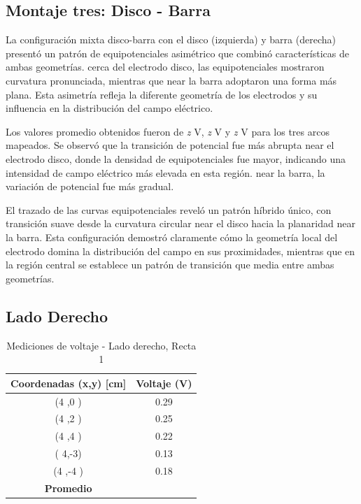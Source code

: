 \documentclass[11pt,twocolumn]{article}
\begin{document}
\subsection*{Montaje tres: Disco - Barra}

La configuración mixta disco-barra con el disco (izquierda) y barra (derecha) presentó un patrón de equipotenciales asimétrico que combinó características de ambas geometrías. cerca del electrodo disco, las equipotenciales mostraron curvatura pronunciada, mientras que near la barra adoptaron una forma más plana. Esta asimetría refleja la diferente geometría de los electrodos y su influencia en la distribución del campo eléctrico.

Los valores promedio obtenidos fueron de \textit{z} V, \textit{z} V y \textit{z} V para los tres arcos mapeados. Se observó que la transición de potencial fue más abrupta near el electrodo disco, donde la densidad de equipotenciales fue mayor, indicando una intensidad de campo eléctrico más elevada en esta región. near la barra, la variación de potencial fue más gradual.

El trazado de las curvas equipotenciales reveló un patrón híbrido único, con transición suave desde la curvatura circular near el disco hacia la planaridad near la barra. Esta configuración demostró claramente cómo la geometría local del electrodo domina la distribución del campo en sus proximidades, mientras que en la región central se establece un patrón de transición que media entre ambas geometrías.


\subsection*{Lado Derecho}

\begin{table}[h]
\centering
\caption{Mediciones de voltaje - Lado derecho, Recta 1}
\begin{tabular}{cc}
\toprule
\textbf{Coordenadas (x,y) [cm]} & \textbf{Voltaje (V)} \\
\midrule
(4 ,0 ) & 0.29 \\
(4 ,2 ) &  0.25\\
(4 ,4 ) &  0.22\\
( 4,-3) &  0.13\\
(4 ,-4 ) & 0.18 \\
\midrule
\textbf{Promedio} &  \\
\bottomrule
\end{tabular}
\end{table}
\end{document}
